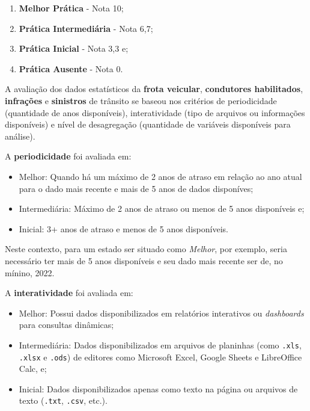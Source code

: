 \documentclass[
  a4paper,
]{article}
\begin{document}
\begin{enumerate}
\def\labelenumi{\arabic{enumi}.}
\item
  \textbf{Melhor Prática} - Nota 10;
\item
  \textbf{Prática Intermediária} - Nota 6,7;
\item
  \textbf{Prática Inicial} - Nota 3,3 e;
\item
  \textbf{Prática Ausente} - Nota 0.
\end{enumerate}

A avaliação dos dados estatísticos da \textbf{frota veicular},
\textbf{condutores habilitados}, \textbf{infrações} e \textbf{sinistros}
de trânsito se baseou nos critérios de periodicidade (quantidade de anos
disponíveis), interatividade (tipo de arquivos ou informações
disponíveis) e nível de desagregação (quantidade de variáveis
disponíveis para análise).

A \textbf{periodicidade} foi avaliada em:

\begin{itemize}
\item
  Melhor: Quando há um máximo de 2 anos de atraso em relação ao ano
  atual para o dado mais recente e mais de 5 anos de dados disponíves;
\item
  Intermediária: Máximo de 2 anos de atraso ou menos de 5 anos
  disponíveis e;
\item
  Inicial: 3+ anos de atraso e menos de 5 anos disponíveis.
\end{itemize}

Neste contexto, para um estado ser situado como \emph{Melhor}, por
exemplo, seria necessário ter mais de 5 anos disponíveis e seu dado mais
recente ser de, no mínino, 2022.

A \textbf{interatividade} foi avaliada em:

\begin{itemize}
\item
  Melhor: Possui dados disponibilizados em relatórios interativos ou
  \emph{dashboards} para consultas dinâmicas;
\item
  Intermediária: Dados disponibilizados em arquivos de planinhas (como
  \texttt{.xls}, \texttt{.xlsx} e \texttt{.ods}) de editores como
  Microsoft Excel, Google Sheets e LibreOffice Calc, e;
\item
  Inicial: Dados disponibilizados apenas como texto na página ou
  arquivos de texto (\texttt{.txt}, \texttt{.csv}, etc.).
\end{itemize}
\end{document}
